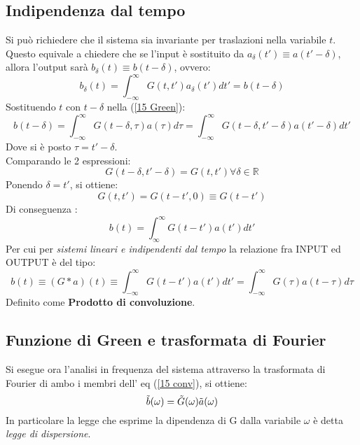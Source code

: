 \documentclass[twoside]{article}
\begin{document}
\subsection{Indipendenza dal tempo}
Si può richiedere che il sistema sia invariante per traslazioni nella variabile $t$.\\
Questo equivale a chiedere che se l'input è sostituito da $a_\delta(t')\equiv a(t'-\delta)$, allora l'output sarà $b_\delta(t)\equiv b(t-\delta)$, ovvero:
\begin{equation}
    b_\delta(t)=\int_{-\infty}^\infty G(t,t')a_\delta(t')dt'=b(t-\delta)
\end{equation}
Sostituendo $t$ con $t-\delta$ nella (\ref{15 Green}):
\begin{equation}
    b(t-\delta)=\int_{-\infty}^\infty G(t-\delta,\tau)a(\tau)d\tau=\int_{-\infty}^\infty G(t-\delta,t'-\delta)a(t'-\delta)dt'
\end{equation}
Dove si è posto $\tau=t'-\delta$.\\
Comparando le 2 espressioni:
\begin{equation}
    G(t-\delta,t'-\delta)=G(t,t') \forall \delta \in \mathds{R}
\end{equation}
Ponendo $\delta=t'$, si ottiene:
\begin{equation}
    G(t,t')=G(t-t',0)\equiv G(t-t')
\end{equation}
Di conseguenza :
\begin{equation}
    b(t)=\int_{\infty}^\infty G(t-t')a(t')dt'
\end{equation}
Per cui per \textit{sistemi lineari e indipendenti dal tempo} la relazione fra INPUT ed OUTPUT è del tipo:
\begin{equation}\label{15 conv}
    b(t)\equiv (G*a)(t)\equiv \int_{-\infty}^\infty G(t-t')a(t')dt'=\int_{-\infty}^\infty G(\tau)a(t-\tau)d\tau
\end{equation}
Definito come \textbf{Prodotto di convoluzione}.
\subsection{Funzione di Green e trasformata di Fourier}
Si esegue ora l'analisi in frequenza del sistema attraverso la trasformata di Fourier di ambo i membri dell' eq (\ref{15 conv}), si ottiene:
\begin{equation}\label{15 trasf}
    \Tilde{b}(\omega)=\Tilde{G}(\omega)\Tilde{a}(\omega)
\end{equation}
In particolare la legge che esprime la dipendenza di G dalla variabile $\omega$ è detta \textit{legge di dispersione}.
\end{document}
